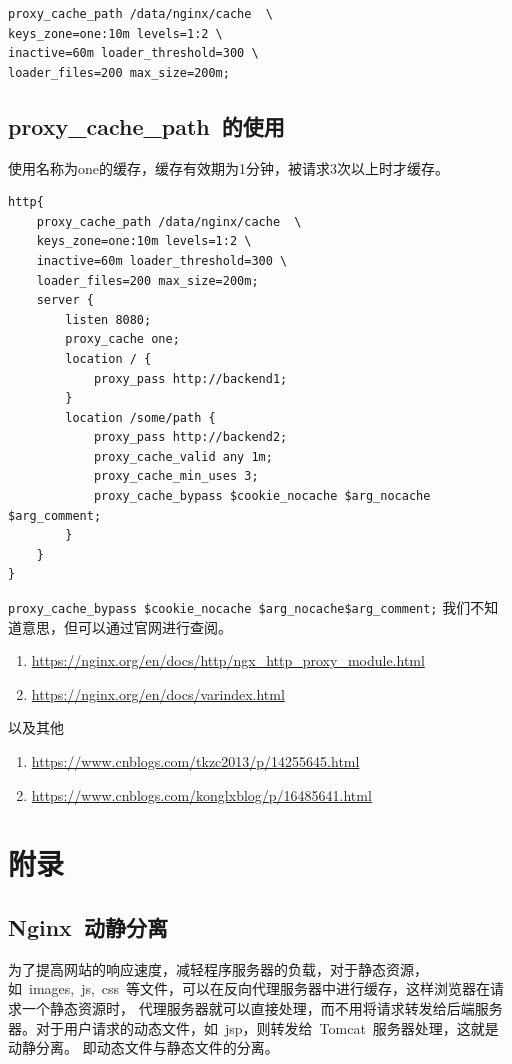 \documentclass[12pt, a4paper]{article} %
\begin{document}
\begin{CJK*}{UTF8}{gbsn}
\begin{lstlisting}
proxy_cache_path /data/nginx/cache  \
keys_zone=one:10m levels=1:2 \
inactive=60m loader_threshold=300 \
loader_files=200 max_size=200m;
\end{lstlisting}

\subsection{proxy\_cache\_path~的使用}
使用名称为one的缓存，缓存有效期为1分钟，被请求3次以上时才缓存。
\begin{lstlisting}
http{
    proxy_cache_path /data/nginx/cache  \
    keys_zone=one:10m levels=1:2 \
    inactive=60m loader_threshold=300 \
    loader_files=200 max_size=200m;
    server {
        listen 8080;
        proxy_cache one;
        location / {
            proxy_pass http://backend1;
        }
        location /some/path {
            proxy_pass http://backend2;
            proxy_cache_valid any 1m;
            proxy_cache_min_uses 3;
            proxy_cache_bypass $cookie_nocache $arg_nocache $arg_comment;
        }
    }
}
\end{lstlisting}

\verb|proxy_cache_bypass $cookie_nocache $arg_nocache$arg_comment;| 我们不知道意思，但可以通过官网进行查阅。

\begin{enumerate}
    \item \url{https://nginx.org/en/docs/http/ngx_http_proxy_module.html}
    \item \url{https://nginx.org/en/docs/varindex.html}
\end{enumerate}

以及其他

\begin{enumerate}
    \item \url{https://www.cnblogs.com/tkzc2013/p/14255645.html}
    \item \url{https://www.cnblogs.com/konglxblog/p/16485641.html}
\end{enumerate}

\clearpage
\section{附录}
\subsection{Nginx~动静分离}
为了提高网站的响应速度，减轻程序服务器的负载，对于静态资源，如~images,~js,~css~等文件，可以在反向代理服务器中进行缓存，这样浏览器在请求一个静态资源时，
代理服务器就可以直接处理，而不用将请求转发给后端服务器。对于用户请求的动态文件，如~jsp，则转发给~Tomcat~服务器处理，这就是动静分离。
即动态文件与静态文件的分离。


\end{CJK*}
\end{document}
